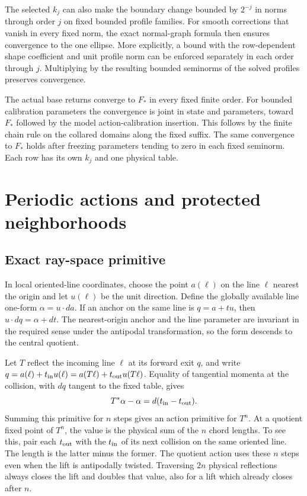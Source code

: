 \documentclass[11pt]{article}
\begin{document}
The selected \(k_j\) can also make the boundary change bounded by \(2^{-j}\) in
norms through order \(j\) on fixed bounded profile families. For smooth
corrections that vanish in every fixed norm, the exact normal-graph formula then
ensures convergence to the one ellipse. More explicitly, a bound with the
row-dependent shape coefficient and unit profile norm can be enforced separately
in each order through \(j\). Multiplying by the resulting bounded seminorms of
the solved profiles preserves convergence.

The actual base returns converge to \(F_*\) in every fixed finite order. For
bounded calibration parameters the convergence is joint in state and parameters,
toward \(F_*\) followed by the model action-calibration insertion. This follows by the
finite chain rule on the collared domains along the fixed suffix. The same
convergence to \(F_*\) holds after freezing parameters tending to zero in each
fixed seminorm. Each row has its own \(k_j\) and one physical table.

\section{Periodic actions and protected neighborhoods}\label{sec:actions}

\subsection{Exact ray-space primitive}\label{exact-ray-space-primitive}

In local oriented-line coordinates, choose the point \(a(\ell)\) on the line
\(\ell\) nearest the origin and let \(u(\ell)\) be the unit direction. Define
the globally available line one-form \(\alpha=u\cdot da\). If an anchor on the
same line is \(q=a+t u\), then \(u\cdot dq=\alpha+dt\). The nearest-origin
anchor and the line parameter are invariant in the required sense under the
antipodal transformation, so the form descends to the central quotient.

Let \(T\) reflect the incoming line \(\ell\) at its forward exit \(q\), and
write \(q=a(\ell)+t_{\rm in}u(\ell)=a(T\ell)+t_{\rm out}u(T\ell)\). Equality of
tangential momenta at the collision, with \(dq\) tangent to the fixed table,
gives \[
 T^*\alpha-\alpha=d(t_{\rm in}-t_{\rm out}).
\] Summing this primitive for \(n\) steps gives an action primitive for \(T^n\).
At a quotient fixed point of \(T^n\), the value is the physical sum of the \(n\)
chord lengths. To see this, pair each \(t_{\rm out}\) with the \(t_{\rm in}\) of
its next collision on the same oriented line. The length is the latter minus the
former. The quotient action uses these \(n\) steps even when the lift is
antipodally twisted. Traversing \(2n\) physical reflections always closes the
lift and doubles that value, also for a lift which already closes after \(n\).
\end{document}
